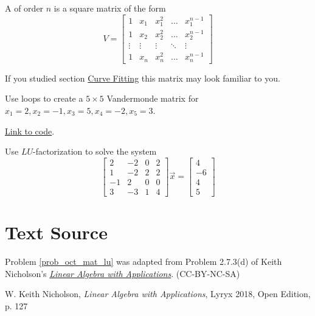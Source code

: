 \documentclass{ximera}
\begin{document}
\begin{problem}\label{prob_oct_mat_vandermonde}
    A  of order $n$ is a square matrix of the form 
        $$V=\begin{bmatrix}
    1&x_1&x_1^2&\dots&x_1^{n-1}\\
    1&x_2&x_2^2&\dots&x_2^{n-1}\\
    \vdots&\vdots&\vdots&\ddots&\vdots\\
    1&x_n&x_n^2&\dots&x_n^{n-1}\end{bmatrix}$$  

    If you studied section \href{https://ximera.osu.edu/linearalgebradzv3/LinearAlgebraInteractiveIntro/APP-0070/main}{Curve Fitting} this matrix may look familiar to you. 

    Use loops to create a $5\times 5$ Vandermonde matrix for $x_1=2, x_2=-1, x_3=5, x_4=-2, x_5=3$.

    \begin{hint}
        \href{https://sagecell.sagemath.org/?z=eJxFjEEKgzAURPeB3GE2goIKsWRTcdcjFDdiJeiXRjQpMdQcv7Fd9A08GAYmwY1mbQgKbxq9dejCIHKUZZkjDLLn7Gi6CoWARFHh0tecnUlwf-odhnZPE1ZrXxgdKU97vJJBolVmIrfZaGzKOx04m-O_bsRVcobIWZd_PWlTnS9Zc6Q6e6RLIbL6t5GZOPuq_QBP6C9I&lang=octave&interacts=eJyLjgUAARUAuQ==}{Link to code}.
    \end{hint}
\end{problem}

\begin{problem}\label{prob_oct_mat_lu}
    Use $LU$-factorization to solve the system
    $$\begin{bmatrix}2 &-2&0&2\\1&-2&2&2\\-1&2&0&0\\3&-3&1&4\end{bmatrix}\vec{x}=\begin{bmatrix}4\\-6\\4\\5\end{bmatrix}$$
\end{problem}

\section*{Text Source} Problem \ref{prob_oct_mat_lu} was adapted from Problem 2.7.3(d) of Keith Nicholson's \href{https://open.umn.edu/opentextbooks/textbooks/linear-algebra-with-applications}{\it Linear Algebra with Applications}. (CC-BY-NC-SA)

W. Keith Nicholson, {\it Linear Algebra with Applications}, Lyryx 2018, Open Edition, p. 127 
\end{document}
